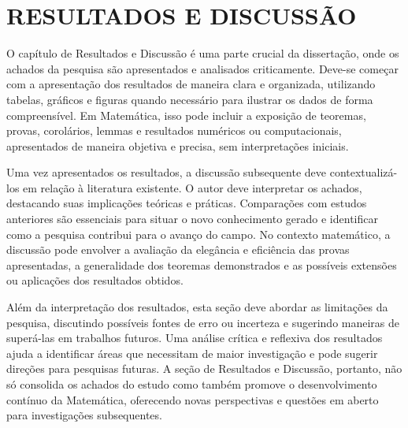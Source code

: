 
\chapter{RESULTADOS E DISCUSSÃO}

O capítulo de Resultados e Discussão é uma parte crucial da dissertação, onde os achados da pesquisa são apresentados e analisados criticamente. Deve-se começar com a apresentação dos resultados de maneira clara e organizada, utilizando tabelas, gráficos e figuras quando necessário para ilustrar os dados de forma compreensível. Em Matemática, isso pode incluir a exposição de teoremas, provas, corolários, lemmas e resultados numéricos ou computacionais, apresentados de maneira objetiva e precisa, sem interpretações iniciais.

Uma vez apresentados os resultados, a discussão subsequente deve contextualizá-los em relação à literatura existente. O autor deve interpretar os achados, destacando suas implicações teóricas e práticas. Comparações com estudos anteriores são essenciais para situar o novo conhecimento gerado e identificar como a pesquisa contribui para o avanço do campo. No contexto matemático, a discussão pode envolver a avaliação da elegância e eficiência das provas apresentadas, a generalidade dos teoremas demonstrados e as possíveis extensões ou aplicações dos resultados obtidos.

Além da interpretação dos resultados, esta seção deve abordar as limitações da pesquisa, discutindo possíveis fontes de erro ou incerteza e sugerindo maneiras de superá-las em trabalhos futuros. Uma análise crítica e reflexiva dos resultados ajuda a identificar áreas que necessitam de maior investigação e pode sugerir direções para pesquisas futuras. A seção de Resultados e Discussão, portanto, não só consolida os achados do estudo como também promove o desenvolvimento contínuo da Matemática, oferecendo novas perspectivas e questões em aberto para investigações subsequentes.
